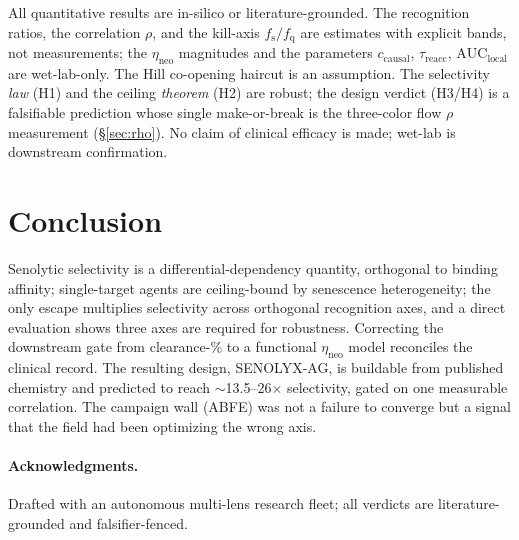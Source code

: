 \documentclass[11pt,a4paper]{article}
\newcommand{\fs}{f_{\mathrm{s}}}
\newcommand{\fq}{f_{\mathrm{q}}}
\begin{document}
All quantitative results are in-silico or literature-grounded. The recognition
ratios, the correlation $\rho$, and the kill-axis $\fs/\fq$ are estimates with
explicit bands, not measurements; the $\eta_{\mathrm{neo}}$ magnitudes and the
parameters $c_{\mathrm{causal}}$, $\tau_{\mathrm{reacc}}$, $\mathrm{AUC_{local}}$
are wet-lab-only. The Hill co-opening haircut is an assumption. The selectivity
\emph{law} (H1) and the ceiling \emph{theorem} (H2) are robust; the design
verdict (H3/H4) is a falsifiable prediction whose single make-or-break is the
three-color flow $\rho$ measurement (\S\ref{sec:rho}). No claim of clinical
efficacy is made; wet-lab is downstream confirmation.

\section{Conclusion}
\label{sec:conclusion}

Senolytic selectivity is a differential-dependency quantity, orthogonal to
binding affinity; single-target agents are ceiling-bound by senescence
heterogeneity; the only escape multiplies selectivity across orthogonal
recognition axes, and a direct evaluation shows three axes are required for
robustness. Correcting the downstream gate from clearance-\% to a functional
$\eta_{\mathrm{neo}}$ model reconciles the clinical record. The resulting design,
SENOLYX-AG, is buildable from published chemistry and predicted to reach
$\sim$13.5--26$\times$ selectivity, gated on one measurable correlation. The
campaign wall (ABFE) was not a failure to converge but a signal that the field
had been optimizing the wrong axis.

\paragraph{Acknowledgments.}
Drafted with an autonomous multi-lens research fleet; all verdicts are
literature-grounded and falsifier-fenced.



\end{document}
